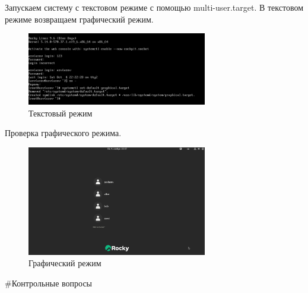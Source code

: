 \documentclass[
  12pt,
  a4paper,
  DIV=11,
  numbers=noendperiod]{scrreprt}
\begin{document}
Запускаем систему с текстовом режиме с помощью multi-user.target. В
текстовом режиме возвращаем графический режим.

\begin{figure}

{\centering \includegraphics[width=0.7\textwidth,height=\textheight]{image/14.png}

}

\caption{Текстовый режим}

\end{figure}%

Проверка графического режима.

\begin{figure}

{\centering \includegraphics[width=0.7\textwidth,height=\textheight]{image/15.png}

}

\caption{Графический режим}

\end{figure}%

\#Контрольные вопросы
\end{document}
